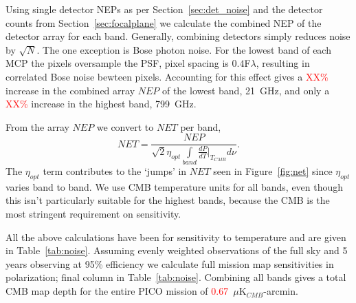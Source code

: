 \documentclass[]{spie}  %
\newcommand{\comr}[1]{\textcolor{red}{#1}}
\begin{document}
Using single detector NEPs as per Section~\ref{sec:det_noise} and the detector counts from Section~\ref{sec:focalplane} we 
calculate the combined NEP of the detector array for each band.  Generally, combining detectors simply reduces noise by $\sqrt{N}$.  The one 
exception is Bose photon noise. For the lowest band of each MCP the pixels oversample the PSF, pixel spacing is $0.4$F$\lambda$, resulting in correlated 
Bose noise bewteen pixels.  Accounting for this effect gives a \comr{XX\%} increase in the combined array $NEP$ of the lowest band, 21~GHz, and only 
a \comr{XX\%} increase in the highest band, 799~GHz.  

From the array $NEP$ we convert to $NET$ per band,
\begin{equation}
\label{eq:NET}
NET = \frac{NEP}{\sqrt{2}\eta_{opt} \int\limits_{band}\frac{dP}{dT}\Bigr|_{T_{CMB}} d\nu }.
\end{equation} 
The $\eta_{opt}$ term contributes to the `jumps' in $NET$ seen in Figure~\ref{fig:net} since $\eta_{opt}$ varies band to band.  We use CMB temperature 
units for all bands, even though this isn't particularly suitable for the highest bands, because the CMB is the most stringent requirement on sensitivity.

All the above calculations have been for sensitivity to temperature and are given in Table~\ref{tab:noise}.  Assuming evenly weighted observations 
of the full sky and 5 years observing at 95\% efficiency we calculate full mission map sensitivities in polarization; final column in Table~\ref{tab:noise}.
Combining all bands gives a total CMB map depth for the entire PICO mission of \comr{0.67}~$\mu$K$_{CMB}$-arcmin.
\end{document}
